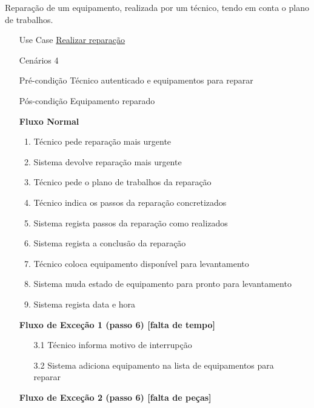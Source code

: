 \documentclass[../relatorio.tex]{subfiles}
\begin{document}
Reparação de um equipamento, realizada por um técnico, tendo em conta o plano de trabalhos.
\begin{itemize}
    \item[Use Case] {\underline{Realizar reparação}}
    \item[Cenários] {4}
    \item[Pré-condição] {Técnico autenticado e equipamentos para reparar}
    \item[Pós-condição] {Equipamento reparado}
          \begin{flushleft}
              \textbf{Fluxo Normal}
          \end{flushleft}
          \begin{enumerate}
              \item Técnico pede reparação mais urgente
              \item Sistema devolve reparação mais urgente
              \item Técnico pede o plano de trabalhos da reparação
              \item Técnico indica os passos da reparação concretizados
              \item Sistema regista passos da reparação como realizados
              \item Sistema regista a conclusão da reparação
              \item Técnico coloca equipamento disponível para levantamento
              \item Sistema muda estado de equipamento para pronto para levantamento
              \item Sistema regista data e hora
          \end{enumerate}
          \begin{flushleft}
              \textbf{Fluxo de Exceção 1 (passo 6) [falta de tempo]}
          \end{flushleft}
          \begin{itemize}
              \item[3.1]{Técnico informa motivo de interrupção}
              \item[3.2]{Sistema adiciona equipamento na lista de equipamentos para \\
                         reparar}
          \end{itemize}
          \begin{flushleft}
              \textbf{Fluxo de Exceção 2 (passo 6) [falta de peças]}
          \end{flushleft}

\end{itemize}
\end{document}
